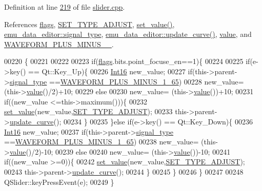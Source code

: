 Definition at line \hyperlink{a00133_source_l00219}{219} of file \hyperlink{a00133_source}{slider.\+cpp}.



References \hyperlink{a00077_ade6449558d429b66e5ed1381bc9b9060}{flags}, \hyperlink{a00090_source_l00049}{S\+E\+T\+\_\+\+T\+Y\+P\+E\+\_\+\+A\+D\+J\+U\+S\+T}, \hyperlink{a00133_source_l00102}{set\+\_\+value()}, \hyperlink{a00094_source_l00039}{emu\+\_\+data\+\_\+editor\+::signal\+\_\+type}, \hyperlink{a00093_source_l00284}{emu\+\_\+data\+\_\+editor\+::update\+\_\+curve()}, \hyperlink{a00116_source_l00145}{value}, and \hyperlink{a00090_source_l00040}{W\+A\+V\+E\+F\+O\+R\+M\+\_\+\+P\+L\+U\+S\+\_\+\+M\+I\+N\+U\+S\+\_\+\_}.


\begin{DoxyCode}
00220 \{
00221 
00222 
00223     \textcolor{keywordflow}{if}(\hyperlink{a00077_ade6449558d429b66e5ed1381bc9b9060}{flags}.bits.point\_focuse\_en==1)\{
00224 
00225     \textcolor{keywordflow}{if}(e->key() == Qt::Key\_Up)\{
00226         \hyperlink{a00004_a3985266aecb120f269789241c170850c}{Int16} new\_value;
00227         \textcolor{keywordflow}{if}(this->parent->\hyperlink{a00008_a070edaec5aee6ba1f5a6866bc32c8ce4}{signal\_type} ==\hyperlink{a00090_a0923d3b365a36e1e8c401cec964aa36f}{WAVEFORM\_PLUS\_MINUS\_1\_65})
00228         new\_value= (this->\hyperlink{a00116_aee90379adb0307effb138f4871edbc5c}{value}()/2)+10;
00229         \textcolor{keywordflow}{else}
00230         new\_value= (this->\hyperlink{a00116_aee90379adb0307effb138f4871edbc5c}{value}())+10;
00231         \textcolor{keywordflow}{if}((new\_value <=this->maximum()))\{
00232             \hyperlink{a00077_ae3010d3de02715db2f443560d7d2a27b}{set\_value}(new\_value,\hyperlink{a00090_a16b6b7b5ad68ec0dd62a3c9e97f88adb}{SET\_TYPE\_ADJUST});
00233             this->parent->\hyperlink{a00008_a15cbcf5f0a17281468800f47898f60c1}{update\_curve}();
00234         \}
00235     \}\textcolor{keywordflow}{else} \textcolor{keywordflow}{if}(e->key() == Qt::Key\_Down)\{
00236         \hyperlink{a00004_a3985266aecb120f269789241c170850c}{Int16} new\_value;
00237         \textcolor{keywordflow}{if}(this->parent->\hyperlink{a00008_a070edaec5aee6ba1f5a6866bc32c8ce4}{signal\_type} ==\hyperlink{a00090_a0923d3b365a36e1e8c401cec964aa36f}{WAVEFORM\_PLUS\_MINUS\_1\_65})
00238         new\_value= (this->\hyperlink{a00116_aee90379adb0307effb138f4871edbc5c}{value}()/2)-10;
00239         \textcolor{keywordflow}{else}
00240         new\_value= (this->\hyperlink{a00116_aee90379adb0307effb138f4871edbc5c}{value}())-10;
00241         \textcolor{keywordflow}{if}((new\_value >=0))\{
00242             \hyperlink{a00077_ae3010d3de02715db2f443560d7d2a27b}{set\_value}(new\_value,\hyperlink{a00090_a16b6b7b5ad68ec0dd62a3c9e97f88adb}{SET\_TYPE\_ADJUST});
00243             this->parent->\hyperlink{a00008_a15cbcf5f0a17281468800f47898f60c1}{update\_curve}();
00244         \}
00245     \}
00246     \}
00247 
00248     QSlider::keyPressEvent(e);
00249 \}
\end{DoxyCode}


